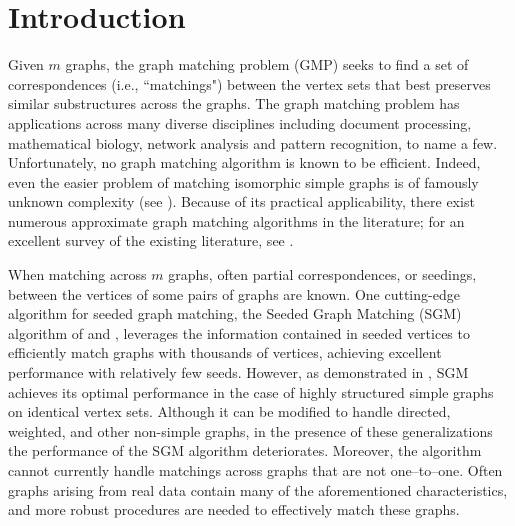 \documentclass[12pt]{article}
\numberwithin{equation}{section}
\theoremstyle{definition}
\begin{document}
\newpage
{} %
\section{Introduction}

Given $m$ graphs, the graph matching problem (GMP) seeks to find a set of correspondences (i.e., ``matchings")  between the vertex sets that best preserves similar substructures across the graphs.
The graph matching problem has applications across many diverse disciplines including document processing, mathematical biology, network analysis and pattern recognition, to name a few.  Unfortunately, no graph matching algorithm is known to be efficient.  Indeed, even the easier problem of matching isomorphic simple graphs is of famously unknown complexity (see \cite{gandj}).
Because of its practical applicability, there exist numerous approximate graph matching algorithms in the literature; for an excellent survey of the existing literature, see \cite{30ygm}.


When matching across $m$ graphs, often partial correspondences, or
seedings, between the vertices of some pairs of graphs are known. One
cutting-edge algorithm for seeded graph matching, the Seeded Graph
Matching (SGM) algorithm of \cite{FAP} and \cite{sgm2}, leverages the
information contained in seeded vertices to efficiently match graphs
with thousands of vertices, achieving excellent performance with
relatively few seeds. However, as demonstrated in \cite{FAP}, SGM
achieves its optimal performance in the case of highly structured simple
graphs on identical vertex sets.  Although it can be modified to handle
directed, weighted, and other non-simple graphs,
in the presence of these generalizations the performance of the SGM
algorithm deteriorates. 
Moreover, the algorithm cannot currently handle matchings across graphs
that are not one--to--one. 
Often graphs arising from real data contain many of the aforementioned
characteristics, and more robust procedures are needed to effectively
match these graphs.
\end{document}
